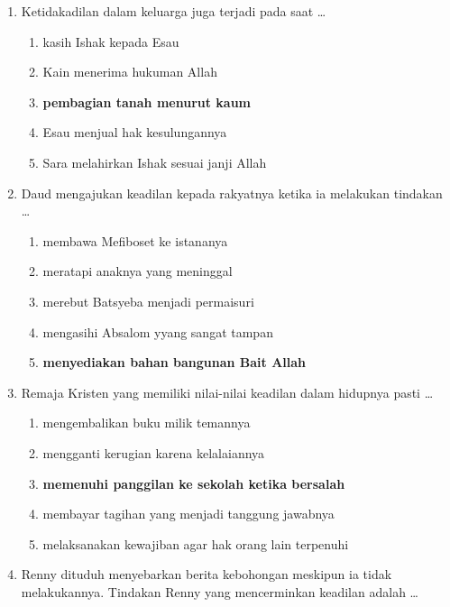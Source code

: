 \documentclass[12pt]{article}
\begin{document}
\begin{enumerate}
\begin{enumerate}
            \end{enumerate}
        \item Ketidakadilan dalam keluarga juga terjadi pada saat \dots
            \begin{enumerate}
                \item kasih Ishak kepada Esau
                \item Kain menerima hukuman Allah
                \item \textbf{pembagian tanah menurut kaum}
                \item Esau menjual hak kesulungannya
                \item Sara melahirkan Ishak sesuai janji Allah 
            \end{enumerate}
        \item Daud mengajukan keadilan kepada rakyatnya ketika ia melakukan tindakan \dots
            \begin{enumerate}
                \item membawa Mefiboset ke istananya
                \item meratapi anaknya yang meninggal
                \item merebut Batsyeba menjadi permaisuri
                \item mengasihi Absalom yyang sangat tampan
                \item \textbf{menyediakan bahan bangunan Bait Allah}
            \end{enumerate}
        \item Remaja Kristen yang memiliki nilai-nilai keadilan dalam hidupnya pasti \dots
            \begin{enumerate}
                \item mengembalikan buku milik temannya
                \item mengganti kerugian karena kelalaiannya
                \item \textbf{memenuhi panggilan ke sekolah ketika bersalah}
                \item membayar tagihan yang menjadi tanggung jawabnya
                \item melaksanakan kewajiban agar hak orang lain terpenuhi
            \end{enumerate}
        \item Renny dituduh menyebarkan berita kebohongan meskipun ia tidak melakukannya.
            Tindakan Renny yang mencerminkan keadilan adalah \dots
            \begin{enumerate}

\end{enumerate}
\end{enumerate}
\end{document}
